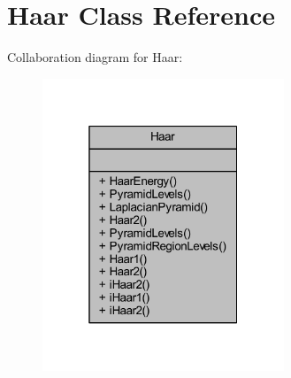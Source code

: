 \hypertarget{class_haar}{}\section{Haar Class Reference}
\label{class_haar}


Collaboration diagram for Haar\+:
\nopagebreak
\begin{figure}[H]
\begin{center}
\leavevmode
\includegraphics[width=205pt]{class_haar__coll__graph}
\end{center}
\end{figure}
